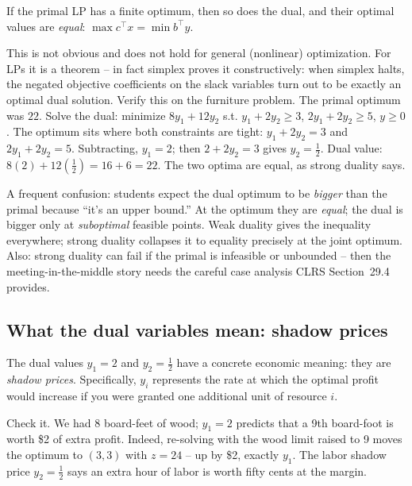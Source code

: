 \begin{theorem}
If the primal LP has a finite optimum, then so does the dual, and their optimal
values are \emph{equal}: $\max c^\top x = \min b^\top y$.
\end{theorem}

This is not obvious and does not hold for general (nonlinear) optimization. For
LPs it is a theorem -- in fact simplex proves it constructively: when simplex
halts, the negated objective coefficients on the slack variables turn out to be
exactly an optimal dual solution. Verify this on the furniture problem. The
primal optimum was $22$. Solve the dual: minimize $8y_1 + 12y_2$ s.t.
$y_1 + 2y_2 \ge 3$, $2y_1+2y_2 \ge 5$, $y \ge 0$. The optimum sits where both
constraints are tight: $y_1 + 2y_2 = 3$ and $2y_1 + 2y_2 = 5$. Subtracting,
$y_1 = 2$; then $2 + 2y_2 = 3$ gives $y_2 = \tfrac12$. Dual value:
$8(2) + 12(\tfrac12) = 16 + 6 = 22$. The two optima are equal, as strong duality says.

\begin{trapbox}
A frequent confusion: students expect the dual optimum to be \emph{bigger} than
the primal because ``it's an upper bound.'' At the optimum they are
\emph{equal}; the dual is bigger only at \emph{suboptimal} feasible points. Weak
duality gives the inequality everywhere; strong duality collapses it to
equality precisely at the joint optimum. Also: strong duality can fail if the
primal is infeasible or unbounded -- then the meeting-in-the-middle story needs
the careful case analysis CLRS Section~29.4 provides.
\end{trapbox}

\subsection{What the dual variables mean: shadow prices}

The dual values $y_1 = 2$ and $y_2 = \tfrac12$ have a concrete economic
meaning: they are \emph{shadow prices}.
Specifically, $y_i$ represents the rate at which the optimal profit would
increase if you were granted one additional unit of resource $i$.

Check it. We had 8 board-feet of wood; $y_1 = 2$ predicts that a 9th board-foot
is worth \$2 of extra profit. Indeed, re-solving with the wood limit raised to
9 moves the optimum to $(3,3)$ with $z = 24$ -- up by \$2, exactly $y_1$. The
labor shadow price $y_2 = \tfrac12$ says an extra hour of labor is worth fifty
cents at the margin.

